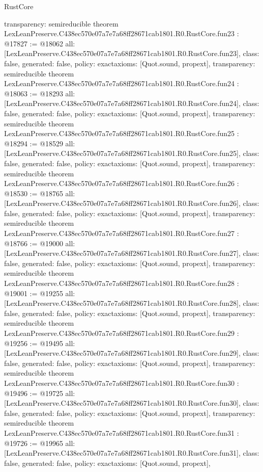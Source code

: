 \begin{lexlean}{RustCore}
\begin{coremodule}
{  transparency: semireducible
}
theorem LexLeanPreserve.C438ec570e07a7e7a68ff28671cab1801.R0.RustCore.fun23 : @17827 := @18062 {
  all: [LexLeanPreserve.C438ec570e07a7e7a68ff28671cab1801.R0.RustCore.fun23],
  class: false,
  generated: false,
  policy: exact{axioms: [Quot.sound, propext]},
  transparency: semireducible
}
theorem LexLeanPreserve.C438ec570e07a7e7a68ff28671cab1801.R0.RustCore.fun24 : @18063 := @18293 {
  all: [LexLeanPreserve.C438ec570e07a7e7a68ff28671cab1801.R0.RustCore.fun24],
  class: false,
  generated: false,
  policy: exact{axioms: [Quot.sound, propext]},
  transparency: semireducible
}
theorem LexLeanPreserve.C438ec570e07a7e7a68ff28671cab1801.R0.RustCore.fun25 : @18294 := @18529 {
  all: [LexLeanPreserve.C438ec570e07a7e7a68ff28671cab1801.R0.RustCore.fun25],
  class: false,
  generated: false,
  policy: exact{axioms: [Quot.sound, propext]},
  transparency: semireducible
}
theorem LexLeanPreserve.C438ec570e07a7e7a68ff28671cab1801.R0.RustCore.fun26 : @18530 := @18765 {
  all: [LexLeanPreserve.C438ec570e07a7e7a68ff28671cab1801.R0.RustCore.fun26],
  class: false,
  generated: false,
  policy: exact{axioms: [Quot.sound, propext]},
  transparency: semireducible
}
theorem LexLeanPreserve.C438ec570e07a7e7a68ff28671cab1801.R0.RustCore.fun27 : @18766 := @19000 {
  all: [LexLeanPreserve.C438ec570e07a7e7a68ff28671cab1801.R0.RustCore.fun27],
  class: false,
  generated: false,
  policy: exact{axioms: [Quot.sound, propext]},
  transparency: semireducible
}
theorem LexLeanPreserve.C438ec570e07a7e7a68ff28671cab1801.R0.RustCore.fun28 : @19001 := @19255 {
  all: [LexLeanPreserve.C438ec570e07a7e7a68ff28671cab1801.R0.RustCore.fun28],
  class: false,
  generated: false,
  policy: exact{axioms: [Quot.sound, propext]},
  transparency: semireducible
}
theorem LexLeanPreserve.C438ec570e07a7e7a68ff28671cab1801.R0.RustCore.fun29 : @19256 := @19495 {
  all: [LexLeanPreserve.C438ec570e07a7e7a68ff28671cab1801.R0.RustCore.fun29],
  class: false,
  generated: false,
  policy: exact{axioms: [Quot.sound, propext]},
  transparency: semireducible
}
theorem LexLeanPreserve.C438ec570e07a7e7a68ff28671cab1801.R0.RustCore.fun30 : @19496 := @19725 {
  all: [LexLeanPreserve.C438ec570e07a7e7a68ff28671cab1801.R0.RustCore.fun30],
  class: false,
  generated: false,
  policy: exact{axioms: [Quot.sound, propext]},
  transparency: semireducible
}
theorem LexLeanPreserve.C438ec570e07a7e7a68ff28671cab1801.R0.RustCore.fun31 : @19726 := @19965 {
  all: [LexLeanPreserve.C438ec570e07a7e7a68ff28671cab1801.R0.RustCore.fun31],
  class: false,
  generated: false,
  policy: exact{axioms: [Quot.sound, propext]},
}
\end{coremodule}
\end{lexlean}
